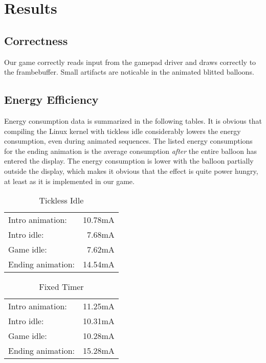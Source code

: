 \chapter{Results}

\section{Correctness}

Our game correctly reads input from the gamepad driver and draws correctly to
the frambebuffer. Small artifacts are noticable in the animated blitted
balloons.

\section{Energy Efficiency}

Energy consumption data is summarized in the following tables. It is obvious
that compiling the Linux kernel with tickless idle considerably lowers the
energy consumption, even during animated sequences. The listed energy
consumptions for the ending animation is the average consumption \emph{after}
the entire balloon has entered the display. The energy consumption is lower with
the balloon partially outside the display, which makes it obvious that the
effect is quite power hungry, at least as it is implemented in our game.

\begin{table}
\caption{Tickless Idle}
\centering
\label{tab:tickless}
\begin{tabular}{l r}
	Intro animation:&10.78mA\\
	Intro idle:&7.68mA\\
	Game idle:&7.62mA\\
	Ending animation:&14.54mA
\end{tabular}
\end{table}

\begin{table}
\caption{Fixed Timer}
\centering
\label{tab:fixed}
\begin{tabular}{l r}
	Intro animation:&11.25mA\\
	Intro idle:&10.31mA\\
	Game idle:&10.28mA\\
	Ending animation:&15.28mA
\end{tabular}
\end{table}
